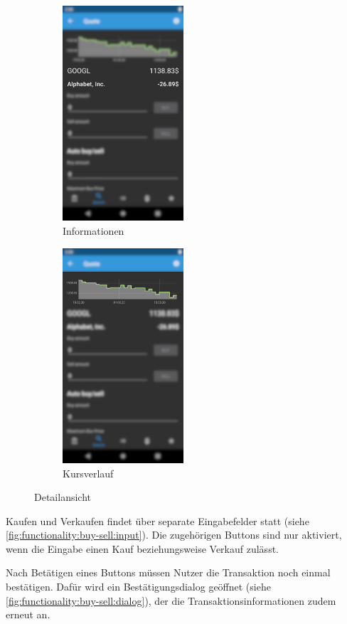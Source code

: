 \documentclass[a4paper]{article}
\begin{document}
\begin{figure}[H]
	\begin{subfigure}{.5\textwidth}
		\centering
		\includegraphics[height=8cm,keepaspectratio]{./images/quote/information.png}
		\caption{Informationen}
		\label{fig:functionality:quote:information}
	\end{subfigure}
	\begin{subfigure}{.5\textwidth}
		\centering
		\includegraphics[height=8cm,keepaspectratio]{./images/quote/history.png}
		\caption{Kursverlauf}
		\label{fig:functionality:quote:history}
	\end{subfigure}
	\caption{Detailansicht}
	\label{fig:functionality:quote}
\end{figure}

Kaufen und Verkaufen findet über separate Eingabefelder statt (siehe \autoref{fig:functionality:buy-sell:input}).
Die zugehörigen Buttons sind nur aktiviert, wenn die Eingabe einen Kauf beziehungsweise Verkauf zulässt.

Nach Betätigen eines Buttons müssen Nutzer die Transaktion noch einmal bestätigen.
Dafür wird ein Bestätigungsdialog geöffnet (siehe \autoref{fig:functionality:buy-sell:dialog}), der die Transaktionsinformationen zudem erneut an.
\end{document}
